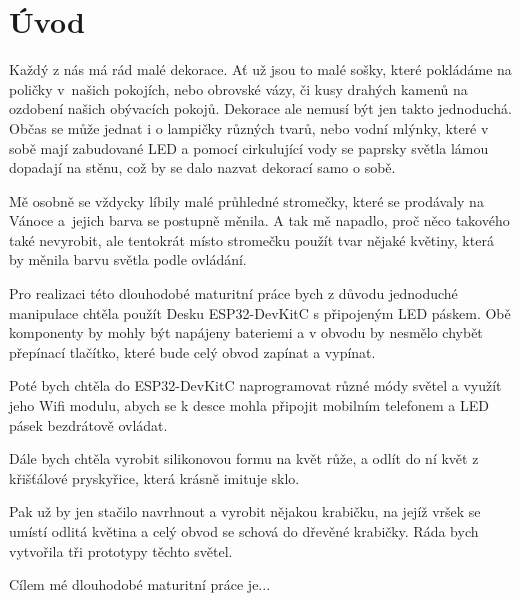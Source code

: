 \chapter*{Úvod}


Každý z nás má rád malé dekorace. Ať už jsou to malé sošky, které pokládáme na poličky v~našich pokojích, nebo obrovské vázy, či kusy drahých kamenů na ozdobení našich obývacích pokojů. Dekorace ale nemusí být jen takto jednoduchá. Občas se může jednat i o lampičky různých tvarů, nebo vodní mlýnky, které v sobě mají zabudované LED a pomocí cirkulující vody se paprsky světla lámou dopadají na stěnu, což by se dalo nazvat dekorací samo o sobě.


Mě osobně se vždycky líbily malé průhledné stromečky, které se prodávaly na Vánoce a~jejich barva se postupně měnila. A tak mě napadlo, proč něco takového také nevyrobit, ale tentokrát místo stromečku použít tvar nějaké květiny, která by měnila barvu světla podle ovládání. 


Pro realizaci této dlouhodobé maturitní práce bych z důvodu jednoduché manipulace chtěla použít Desku ESP32-DevKitC s připojeným LED páskem. Obě komponenty by mohly být napájeny bateriemi a v obvodu by nesmělo chybět přepínací tlačítko, které bude celý obvod zapínat a vypínat.

Poté bych chtěla do ESP32-DevKitC naprogramovat různé módy světel a využít jeho Wifi modulu, abych se k desce mohla připojit mobilním telefonem a LED pásek bezdrátově ovládat. 

Dále bych chtěla vyrobit silikonovou formu na květ růže, a odlít do ní květ z křišťálové pryskyřice, která krásně imituje sklo.

Pak už by jen stačilo navrhnout a vyrobit nějakou krabičku, na jejíž vršek se umístí odlitá květina a celý obvod se schová do dřevěné krabičky. Ráda bych vytvořila tři prototypy těchto světel.

Cílem mé dlouhodobé maturitní práce je...
